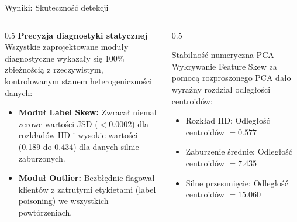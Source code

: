 \documentclass[9pt,aspectratio=169]{beamer}
\begin{document}
\begin{frame}{Wyniki: Skuteczność detekcji}
\begin{columns}[T]
\begin{column}{0.5\textwidth}
\textbf{Precyzja diagnostyki statycznej}\\[4pt]
Wszystkie zaprojektowane moduły diagnostyczne wykazały się 100\% zbieżnością z rzeczywistym, kontrolowanym stanem heterogeniczności danych:
\begin{itemize}\footnotesize
\item \textbf{Moduł Label Skew:} Zwracał niemal zerowe wartości JSD ($<0.0002$) dla rozkładów IID i wysokie wartości (0.189 do 0.434) dla danych silnie zaburzonych.
\item \textbf{Moduł Outlier:} Bezbłędnie flagował klientów z zatrutymi etykietami (label poisoning) we wszystkich powtórzeniach.
\end{itemize}
\end{column}
\begin{column}{0.5\textwidth}
\begin{infobox}{Stabilność numeryczna PCA}
Wykrywanie Feature Skew za pomocą rozproszonego PCA dało wyraźny rozdział odległości centroidów:
\begin{itemize}\footnotesize
\item Rozkład IID: Odległość centroidów $=0.577$
\item Zaburzenie średnie: Odległość centroidów $=7.435$
\item Silne przesunięcie: Odległość centroidów $=15.060$
\end{itemize}
\end{infobox}
\end{column}
\end{columns}
\end{frame}
\end{document}
